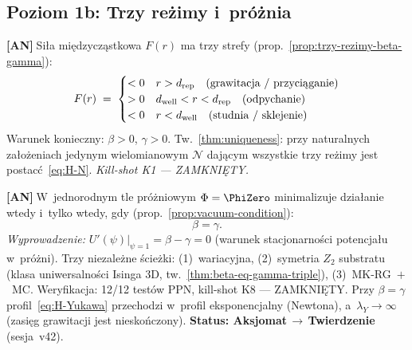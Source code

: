 \subsection{Poziom 1b: Trzy re\.zimy i~pr\'o\.znia}%
\label{app:H-rezimy}

\begin{chain}\label{chain:A6}
  \textbf{[AN]}$\;$Si\l{}a mi\k{e}dzycz\k{a}stkowa $F(r)$
  ma trzy strefy (prop.~\ref{prop:trzy-rezimy-beta-gamma}):
  \begin{equation}\label{eq:H-force}
    F(r) \;=\;
    \begin{cases}
      < 0 & r > d_{\mathrm{rep}} \quad\text{(grawitacja / przyci\k{a}ganie)} \\
      > 0 & d_{\mathrm{well}} < r < d_{\mathrm{rep}} \quad\text{(odpychanie)} \\
      < 0 & r < d_{\mathrm{well}} \quad\text{(studnia / sklejenie)}
    \end{cases}
  \end{equation}
  Warunek konieczny: $\beta > 0$, $\gamma > 0$.
  Tw.~\ref{thm:uniqueness}: przy naturalnych za\l{}o\.zeniach
  jedynym wielomianowym $\mathcal{N}$ daj\k{a}cym wszystkie trzy
  re\.zimy jest postac\'c~\eqref{eq:H-N}.
  \emph{Kill-shot K1 --- ZAMKNI\k{E}TY.}
\end{chain}

\begin{chain}[A7 --- Warunek pr\'o\.zniowy N0-5: $\beta = \gamma$]\label{chain:A7}
  \textbf{[AN]}$\;$W~jednorodnym tle pr\'o\.zniowym
  $\Phi = \PhiZero$ minimalizuje dzia\l{}anie wtedy i~tylko wtedy,
  gdy (prop.~\ref{prop:vacuum-condition}):
  \begin{equation}\label{eq:H-vac}
    \beta = \gamma.
  \end{equation}
  \emph{Wyprowadzenie:} $U'(\psi)\big|_{\psi=1} = \beta - \gamma = 0$
  (warunek stacjonarno\'sci potencja\l{}u w~pr\'o\.zni).
  Trzy niezale\.zne \'scie\.zki: (1)~wariacyjna, (2)~symetria $Z_2$
  substratu (klasa uniwersalno\'sci Isinga 3D,
  tw.~\ref{thm:beta-eq-gamma-triple}), (3)~MK-RG~$+$~MC.
  Weryfikacja: 12/12 test\'ow PPN, kill-shot K8 --- ZAMKNI\k{E}TY.
  Przy $\beta = \gamma$ profil~\eqref{eq:H-Yukawa} przechodzi
  w~profil eksponencjalny (Newtona), a~$\lambda_Y \to \infty$
  (zasi\k{e}g grawitacji jest niesko\'nczony).
  \textbf{Status: Aksjomat\,$\to$\,Twierdzenie} (sesja~v42).
\end{chain}

